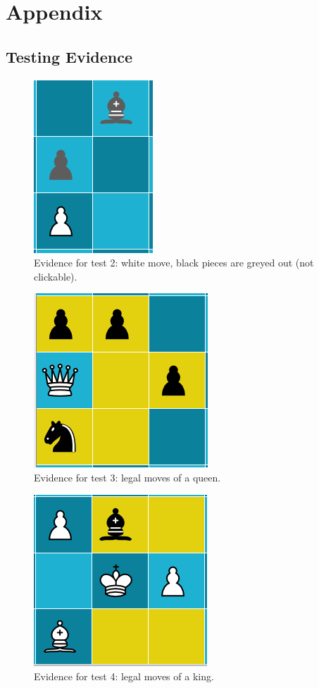 \appendix
\chapter{Appendix} \label{appendix}
\section{Testing Evidence}
\begin{figure}[H]
	\centering
	\includegraphics{images/screenshots/test-2}
	\caption{Evidence for test 2: white move, black pieces are greyed out (not clickable).}
	\label{test-2}
\end{figure}
\begin{figure}[H]
	\centering
	\includegraphics{images/screenshots/test-3}
	\caption{Evidence for test 3: legal moves of a queen.}
	\label{test-3}
\end{figure}
\begin{figure}[H]
	\centering
	\includegraphics{images/screenshots/test-4}
	\caption{Evidence for test 4: legal moves of a king.}
	\label{test-4}
\end{figure}
